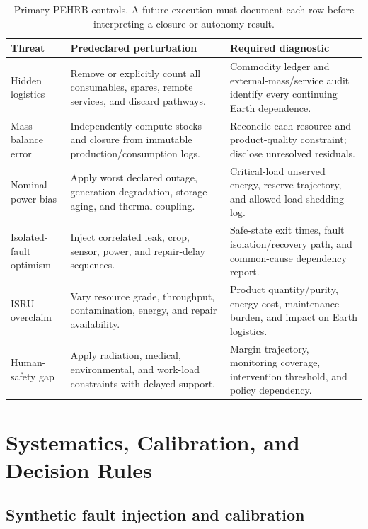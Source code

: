 \documentclass[10pt,conference]{IEEEtran}
\begin{document}
\begin{table}[!t]
\caption{Primary PEHRB controls. A future execution must document each row before interpreting a closure or autonomy result.}
\label{tab:controls}
\centering
\footnotesize
\setlength{\tabcolsep}{2.5pt}
\begin{tabular}{p{}p{}p{}}
\toprule
Threat & Predeclared perturbation & Required diagnostic \\
\midrule
Hidden logistics & Remove or explicitly count all consumables, spares, remote services, and discard pathways. & Commodity ledger and external-mass/service audit identify every continuing Earth dependence. \\
Mass-balance error & Independently compute stocks and closure from immutable production/consumption logs. & Reconcile each resource and product-quality constraint; disclose unresolved residuals. \\
Nominal-power bias & Apply worst declared outage, generation degradation, storage aging, and thermal coupling. & Critical-load unserved energy, reserve trajectory, and allowed load-shedding log. \\
Isolated-fault optimism & Inject correlated leak, crop, sensor, power, and repair-delay sequences. & Safe-state exit times, fault isolation/recovery path, and common-cause dependency report. \\
ISRU overclaim & Vary resource grade, throughput, contamination, energy, and repair availability. & Product quantity/purity, energy cost, maintenance burden, and impact on Earth logistics. \\
Human-safety gap & Apply radiation, medical, environmental, and work-load constraints with delayed support. & Margin trajectory, monitoring coverage, intervention threshold, and policy dependency. \\
\bottomrule
\end{tabular}
\end{table}

\section{Systematics, Calibration, and Decision Rules}
\label{sec:systematics}

\subsection{Synthetic fault injection and calibration}
\end{document}

